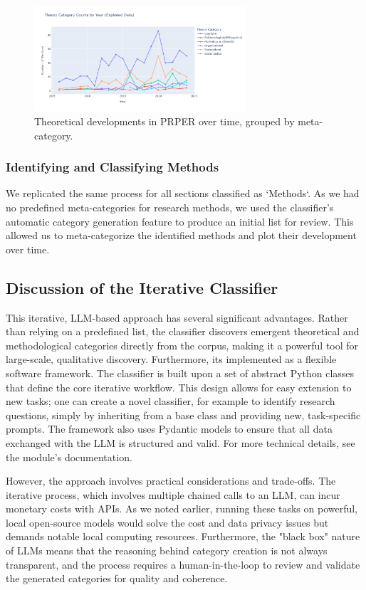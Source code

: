 \begin{figure}
    \centering
    \includegraphics[width=0.7\textwidth]{media/theory_year_exploded.png}
    \caption{Theoretical developments in PRPER over time, grouped by meta-category.}
    \label{fig:theoretical_development}
\end{figure}

\subsubsection{Identifying and Classifying Methods}

We replicated the same process for all sections classified as `Methods`.
As we had no predefined meta-categories for research methods, we used the
classifier's automatic category generation feature to produce an initial list
for review. This allowed us to meta-categorize the identified methods and plot
their development over time.

\subsection{Discussion of the Iterative Classifier}

This iterative, LLM-based approach has several significant advantages. Rather
than relying on a predefined list, the classifier discovers emergent theoretical
and methodological categories directly from the corpus, making it a powerful
tool for large-scale, qualitative discovery. Furthermore, its implemented as a
flexible software framework. The classifier is built upon a set of abstract
Python classes that define the core iterative workflow. This design allows for
easy extension to new tasks; one can create a novel classifier, for example to
identify research questions, simply by inheriting from a base class and
providing new, task-specific prompts. The framework also uses Pydantic models to
ensure that all data exchanged with the LLM is structured and valid. For more
technical details, see the module's documentation.

However, the approach involves practical considerations and trade-offs. The
iterative process, which involves multiple chained calls to an LLM, can incur
monetary costs with APIs. As we noted earlier, running these tasks on powerful,
local open-source models would solve the cost and data privacy issues but
demands notable local computing resources. Furthermore, the "black box" nature
of LLMs means that the reasoning behind category creation is not always
transparent, and the process requires a human-in-the-loop to review and validate
the generated categories for quality and coherence.

